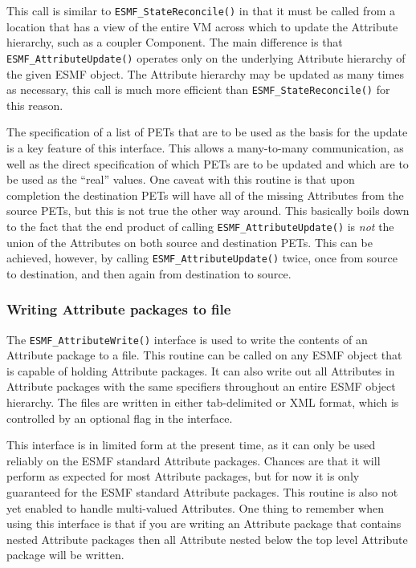 This call is similar to {\tt ESMF\_StateReconcile()} in that it must be called from a location that has a view of the entire VM across which to update the Attribute hierarchy, such as a coupler Component.  The main difference is that {\tt ESMF\_AttributeUpdate()} operates only on the underlying Attribute hierarchy of the given ESMF object.  The Attribute hierarchy may be updated as many times as necessary, this call is much more efficient than {\tt ESMF\_StateReconcile()} for this reason.  

The specification of a list of PETs that are to be used as the basis for the update is a key feature of this interface.  This allows a many-to-many communication, as well as the direct specification of which PETs are to be updated and which are to be used as the ``real'' values.  One caveat with this routine is that upon completion the destination PETs will have all of the missing Attributes from the source PETs, but this is not true the other way around.  This basically boils down to the fact that the end product of calling {\tt ESMF\_AttributeUpdate()} is {\it not} the union of the Attributes on both source and destination PETs.  This can be achieved, however, by calling {\tt ESMF\_AttributeUpdate()} twice, once from source to destination, and then again from destination to source.

\subsubsection{Writing Attribute packages to file}

The {\tt ESMF\_AttributeWrite()} interface is used to write the contents of an Attribute package to a file.  This routine can be called on any ESMF object that is capable of holding Attribute packages.  It can also write out all Attributes in Attribute packages with the same specifiers throughout an entire ESMF object hierarchy.  The files are written in either tab-delimited or XML format, which is controlled by an optional flag in the interface.

This interface is in limited form at the present time, as it can only be used reliably on the ESMF standard Attribute packages.  Chances are that it will perform as expected for most Attribute packages, but for now it is only guaranteed for the ESMF standard Attribute packages.  This routine is also not yet enabled to handle multi-valued Attributes.    One thing to remember when using this interface is that if you are writing an Attribute package that contains nested Attribute packages then all Attribute nested below the top level Attribute package will be written.

